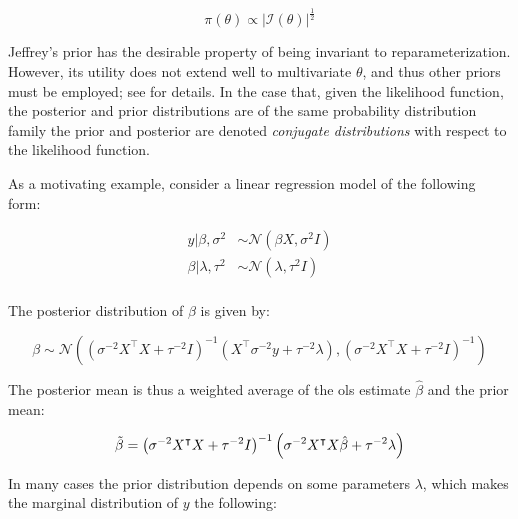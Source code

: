 \documentclass{report}
\begin{document}
\begin{equation}\label{eq:ols-bayes-jeffreys-prior}
    \pi(\theta) \propto |\mathcal{I}(\theta)|^{\frac{1}{2}}
\end{equation}

Jeffrey's prior has the desirable property of being invariant to reparameterization. However, its utility does not extend well to multivariate $\theta$, and thus other priors must be employed; see \cite[Chapter~3.4.1]{wakefield_bayesian_2013} for details. In the case that, given the likelihood function, the posterior and prior distributions are of the same probability distribution family the prior and posterior are denoted \textit{conjugate distributions} with respect to the likelihood function. 

As a motivating example, consider a linear regression model of the following form:

\begin{equation}\label{eq:ols-bayes-model-format}
    \begin{aligned}
        y | \beta, \sigma^2 &\sim \mathcal{N}(\beta X, \sigma^2I) \\
        \beta | \lambda, \tau^2 &\sim \mathcal{N}(\lambda, \tau^2I) \\
    \end{aligned}
\end{equation}

The posterior distribution of $\beta$ is given by:

\begin{equation}\label{eq:ols-bayes-beta-posterior-dist}
    \beta \sim \mathcal{N}\left(\left(\sigma^{-2}X^\intercal X + \tau^{-2} I\right)^{-1}\left(X^\intercal \sigma^{-2} y + \tau^{-2} \lambda\right), \left(\sigma^{-2}X^\intercal X + \tau^{-2} I\right)^{-1}\right)
\end{equation}

The posterior mean is thus a weighted average of the \gls{ols} estimate $\hat{\beta}$ and the prior mean:

\begin{equation}\label{eq:ols-bayes-beta-posterior-mean}
    \Tilde{\beta} = \left(\sigma^{-2} X^\intercal X + \tau^{-2} I\right)^{-1}\left(\sigma^{-2} X^\intercal X \hat{\beta} + \tau^{-2} \lambda\right)
\end{equation}

In many cases the prior distribution depends on some parameters $\lambda$, which makes the marginal distribution of $y$ the following:
\end{document}
